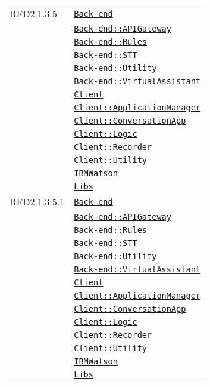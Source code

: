 \begin{longtable}{|>{\centering}m{3cm}|m{10cm}<{\centering}|}
RFD2.1.3.5 & \hyperref[Back-end]{\texttt{Back-end}}\\
& \hyperref[Back-end::APIGateway]{\texttt{Back-end::APIGateway}}\\
& \hyperref[Back-end::Rules]{\texttt{Back-end::Rules}}\\
& \hyperref[Back-end::STT]{\texttt{Back-end::STT}}\\
& \hyperref[Back-end::Utility]{\texttt{Back-end::Utility}}\\
& \hyperref[Back-end::VirtualAssistant]{\texttt{Back-end::VirtualAssistant}}\\
& \hyperref[Client]{\texttt{Client}}\\
& \hyperref[Client::ApplicationManager]{\texttt{Client::ApplicationManager}}\\
& \hyperref[Client::ConversationApp]{\texttt{Client::ConversationApp}}\\
& \hyperref[Client::Logic]{\texttt{Client::Logic}}\\
& \hyperref[Client::Recorder]{\texttt{Client::Recorder}}\\
& \hyperref[Client::Utility]{\texttt{Client::Utility}}\\
& \hyperref[IBMWatson]{\texttt{IBMWatson}}\\
& \hyperref[Libs]{\texttt{Libs}}\\ \hline

RFD2.1.3.5.1 & \hyperref[Back-end]{\texttt{Back-end}}\\
& \hyperref[Back-end::APIGateway]{\texttt{Back-end::APIGateway}}\\
& \hyperref[Back-end::Rules]{\texttt{Back-end::Rules}}\\
& \hyperref[Back-end::STT]{\texttt{Back-end::STT}}\\
& \hyperref[Back-end::Utility]{\texttt{Back-end::Utility}}\\
& \hyperref[Back-end::VirtualAssistant]{\texttt{Back-end::VirtualAssistant}}\\
& \hyperref[Client]{\texttt{Client}}\\
& \hyperref[Client::ApplicationManager]{\texttt{Client::ApplicationManager}}\\
& \hyperref[Client::ConversationApp]{\texttt{Client::ConversationApp}}\\
& \hyperref[Client::Logic]{\texttt{Client::Logic}}\\
& \hyperref[Client::Recorder]{\texttt{Client::Recorder}}\\
& \hyperref[Client::Utility]{\texttt{Client::Utility}}\\
& \hyperref[IBMWatson]{\texttt{IBMWatson}}\\
& \hyperref[Libs]{\texttt{Libs}}\\ \hline


\end{longtable}
